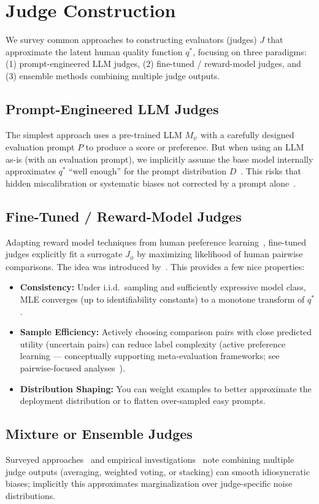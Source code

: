 \section{Judge Construction} 
We survey common approaches to constructing evaluators (judges) $J$ that approximate the latent human quality function $q^{*}$, focusing on three paradigms: (1) prompt-engineered LLM judges, (2) fine-tuned / reward-model judges, and (3) ensemble methods combining multiple judge outputs.

\subsection{Prompt-Engineered LLM Judges}
The simplest approach uses a pre-trained LLM $M_{\psi}$ with a carefully designed evaluation prompt $P$ to produce a score or preference. But when using an LLM as-is (with an evaluation prompt), we implicitly assume the base model internally approximates $q^{*}$ “well enough” for the prompt distribution $D$~\cite{li2024_llmsasjudges, fu2023gptscore}. This risks that hidden miscalibration or systematic biases not corrected by a prompt alone~\cite{bavaresco2024judgebench, hada2024metal}.

\subsection{Fine-Tuned / Reward-Model Judges}
Adapting reward model techniques from human preference learning~\cite{stiennon2020learning, ouyang2022training}, fine-tuned judges explicitly fit a surrogate $J_{\phi}$ by maximizing likelihood of human pairwise comparisons. The idea was introduced by~\cite{zhu2023judgelm}. This provides a few nice properties:
\begin{itemize}
	\item \textbf{Consistency:} Under i.i.d.\ sampling and sufficiently expressive model class, MLE converges (up to identifiability constants) to a monotone transform of $q^{*}$.
	\item \textbf{Sample Efficiency:} Actively choosing comparison pairs with close predicted utility (uncertain pairs) can reduce label complexity (active preference learning — conceptually supporting meta-evaluation frameworks; see pairwise-focused analyses~\cite{liu2024pairs}).
	\item \textbf{Distribution Shaping:} You can weight examples to better approximate the deployment distribution or to flatten over-sampled easy prompts.
\end{itemize}

\subsection{Mixture or Ensemble Judges}
Surveyed approaches~\cite{li2024_llmsasjudges} and empirical investigations~\cite{bavaresco2024judgebench} note combining multiple judge outputs (averaging, weighted voting, or stacking) can smooth idiosyncratic biases; implicitly this approximates marginalization over judge-specific noise distributions.